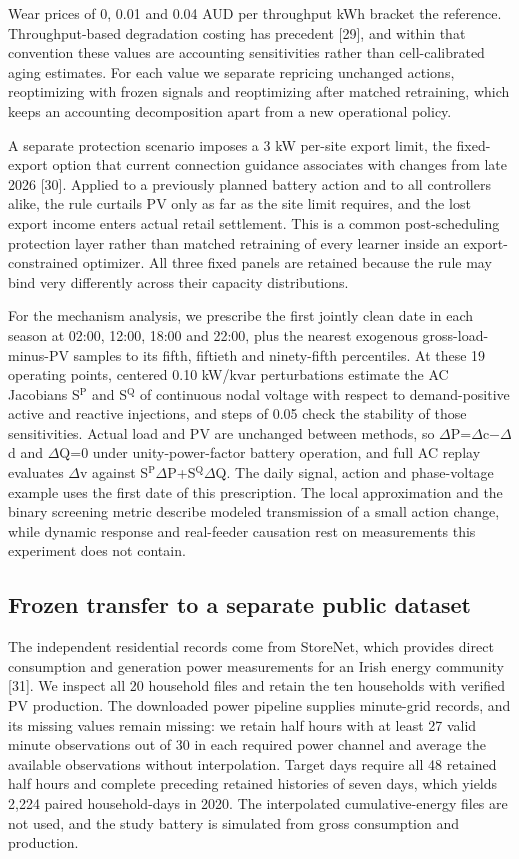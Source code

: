 \documentclass[pdflatex,Numbered,sn-basic]{sn-jnl}
\begin{document}
Wear prices of 0, 0.01 and 0.04 AUD per throughput kWh bracket the reference. Throughput-based degradation costing has precedent [29], and within that convention these values are accounting sensitivities rather than cell-calibrated aging estimates. For each value we separate repricing unchanged actions, reoptimizing with frozen signals and reoptimizing after matched retraining, which keeps an accounting decomposition apart from a new operational policy.

A separate protection scenario imposes a 3 kW per-site export limit, the fixed-export option that current connection guidance associates with changes from late 2026 [30]. Applied to a previously planned battery action and to all controllers alike, the rule curtails PV only as far as the site limit requires, and the lost export income enters actual retail settlement. This is a common post-scheduling protection layer rather than matched retraining of every learner inside an export-constrained optimizer. All three fixed panels are retained because the rule may bind very differently across their capacity distributions.

For the mechanism analysis, we prescribe the first jointly clean date in each season at 02:00, 12:00, 18:00 and 22:00, plus the nearest exogenous gross-load-minus-PV samples to its fifth, fiftieth and ninety-fifth percentiles. At these 19 operating points, centered 0.10 kW/kvar perturbations estimate the AC Jacobians S$^{\mathrm{P}}$ and S$^{\mathrm{Q}}$ of continuous nodal voltage with respect to demand-positive active and reactive injections, and steps of 0.05 check the stability of those sensitivities. Actual load and PV are unchanged between methods, so $\Delta$P=$\Delta$c$-$$\Delta$d and $\Delta$Q=0 under unity-power-factor battery operation, and full AC replay evaluates $\Delta$v against S$^{\mathrm{P}}$$\Delta$P+S$^{\mathrm{Q}}$$\Delta$Q. The daily signal, action and phase-voltage example uses the first date of this prescription. The local approximation and the binary screening metric describe modeled transmission of a small action change, while dynamic response and real-feeder causation rest on measurements this experiment does not contain.

\subsection{Frozen transfer to a separate public dataset}

The independent residential records come from StoreNet, which provides direct consumption and generation power measurements for an Irish energy community [31]. We inspect all 20 household files and retain the ten households with verified PV production. The downloaded power pipeline supplies minute-grid records, and its missing values remain missing: we retain half hours with at least 27 valid minute observations out of 30 in each required power channel and average the available observations without interpolation. Target days require all 48 retained half hours and complete preceding retained histories of seven days, which yields 2,224 paired household-days in 2020. The interpolated cumulative-energy files are not used, and the study battery is simulated from gross consumption and production.
\end{document}
